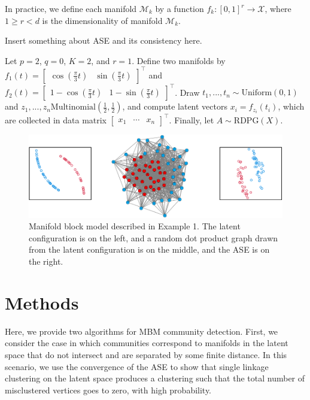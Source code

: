 \documentclass[12pt]{article}
\begin{document}
In practice, we define each manifold \(\mathcal{M}_k\) by a function
\(f_k : [0, 1]^r \to \mathcal{X}\), where \(1 \geq r < d\) is the
dimensionality of manifold \(\mathcal{M}_k\).

Insert something about ASE and its consistency here.

\begin{example}
Let $p = 2$, $q = 0$, $K = 2$, and $r = 1$. 
Define two manifolds by $f_1(t) = \begin{bmatrix} \cos(\frac{\pi}{3} t) & \sin(\frac{\pi}{3} t) \end{bmatrix}^\top$ and $f_2(t) = \begin{bmatrix} 1 - \cos(\frac{\pi}{3} t) & 1 - \sin(\frac{\pi}{3} t) \end{bmatrix}^\top$.
Draw $t_1, ..., t_n \sim \mathrm{Uniform}(0, 1)$ and $z_1, ..., z_n \mathrm{Multinomial}(\frac{1}{2}, \frac{1}{2})$, and compute latent vectors $x_i = f_{z_i}(t_i)$, which are collected in data matrix $\begin{bmatrix} x_1 & \cdots & x_n \end{bmatrix}^\top$. 
Finally, let $A \sim \mathrm{RDPG}(X)$. 

\begin{figure}[H]

{\centering \includegraphics{draft_files/figure-latex/fig1-1} 

}

\caption{Manifold block model described in Example 1. The latent configuration is on the left, and a random dot product graph drawn from the latent configuration is on the middle, and the ASE is on the right.}\label{fig:fig1}
\end{figure}
\end{example}

\hypertarget{methods}{%
\section{Methods}\label{methods}}

Here, we provide two algorithms for MBM community detection. First, we
consider the case in which communities correspond to manifolds in the
latent space that do not intersect and are separated by some finite
distance. In this scenario, we use the convergence of the ASE to show
that single linkage clustering on the latent space produces a clustering
such that the total number of misclustered vertices goes to zero, with
high probability.
\end{document}
